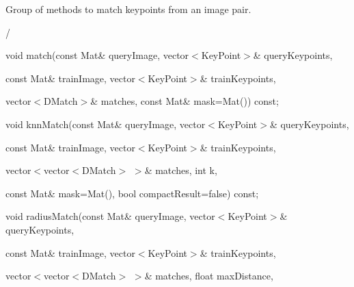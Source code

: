 {\ttfamily  
\begin{DoxyItemize}
\item Group of methods to match keypoints from an image pair. 
\item / 
\end{DoxyItemize}}

{\ttfamily }

{\ttfamily void match(const Mat\& query\+Image, vector$<$\+Key\+Point$>$\& query\+Keypoints,}

{\ttfamily }

{\ttfamily }

{\ttfamily const Mat\& train\+Image, vector$<$\+Key\+Point$>$\& train\+Keypoints,}

{\ttfamily }

{\ttfamily }

{\ttfamily vector$<$\+D\+Match$>$\& matches, const Mat\& mask=Mat()) const;}

{\ttfamily }

{\ttfamily }

{\ttfamily void knn\+Match(const Mat\& query\+Image, vector$<$\+Key\+Point$>$\& query\+Keypoints,}

{\ttfamily }

{\ttfamily }

{\ttfamily const Mat\& train\+Image, vector$<$\+Key\+Point$>$\& train\+Keypoints,}

{\ttfamily }

{\ttfamily }

{\ttfamily vector$<$vector$<$\+D\+Match$>$ $>$\& matches, int k,}

{\ttfamily }

{\ttfamily }

{\ttfamily const Mat\& mask=Mat(), bool compact\+Result=false) const;}

{\ttfamily }

{\ttfamily }

{\ttfamily void radius\+Match(const Mat\& query\+Image, vector$<$\+Key\+Point$>$\& query\+Keypoints,}

{\ttfamily }

{\ttfamily }

{\ttfamily const Mat\& train\+Image, vector$<$\+Key\+Point$>$\& train\+Keypoints,}

{\ttfamily }

{\ttfamily }

{\ttfamily vector$<$vector$<$\+D\+Match$>$ $>$\& matches, float max\+Distance,}

{\ttfamily }

